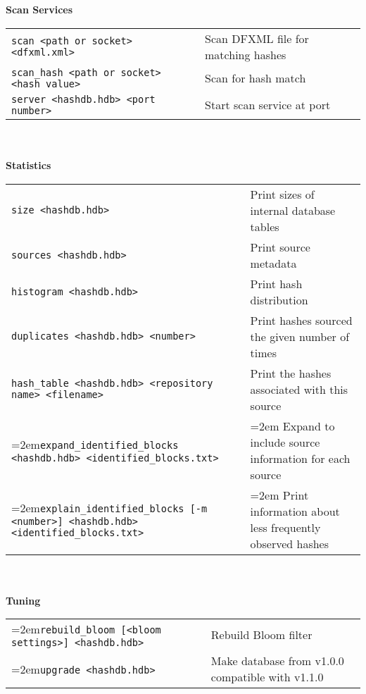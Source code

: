 \documentclass[12pt]{article}
\begin{document}
\\
\\
\textbf{Scan Services} \\
\begin{tabular}{p{3.6 in} p{4 in}}
\small\texttt{scan <path or socket> <dfxml.xml>} & Scan DFXML file for matching hashes \\
\small\texttt{scan\_hash <path or socket> <hash value>} & Scan for hash match \\
\small\texttt{server <hashdb.hdb> <port number>} & Start scan service at port\\
\end{tabular}
\\
\\
\textbf{Statistics}\\
\begin{tabular}{p{3.6 in} p{3.6 in}}
\small\small\texttt{size <hashdb.hdb>} & Print sizes of internal database tables \\
\small\texttt{sources <hashdb.hdb>} & Print source metadata \\
\small\texttt{histogram <hashdb.hdb>} & Print hash distribution \\
\small\texttt{duplicates <hashdb.hdb> <number>} & Print hashes sourced the given number of times \\
\small\texttt{hash\_table <hashdb.hdb> <repository name> <filename>} & Print the hashes associated with this source\\
\hangindent=2em\texttt{expand\_identified\_blocks <hashdb.hdb> <identified\_blocks.txt>} & \hangindent=2em Expand to include source information for each source \\
\hangindent=2em\small\texttt{explain\_identified\_blocks [-m <number>] <hashdb.hdb> <identified\_blocks.txt>} & \hangindent=2em Print information about less frequently observed hashes\\
\end{tabular}
\\
\\
\textbf{Tuning}\\
\begin{tabular}{p{3.6 in} p{4 in}}
\hangindent=2em\small\texttt{rebuild\_bloom [<bloom settings>] <hashdb.hdb>} & Rebuild Bloom filter \\
\hangindent=2em\small\texttt{upgrade <hashdb.hdb>} & Make database from v1.0.0 compatible with v1.1.0\\
\end{tabular}
\\
\\
\end{document}
